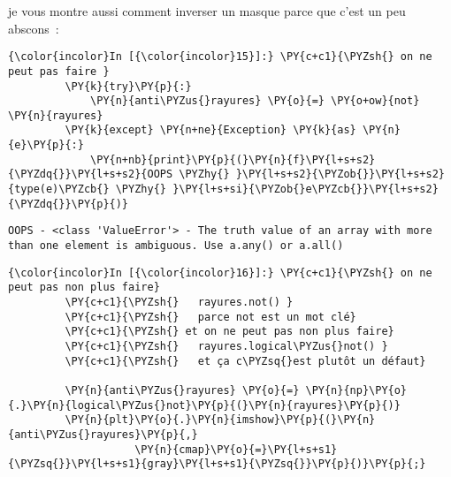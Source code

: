     je vous montre aussi comment inverser un masque parce que c'est un peu
abscons~:

    \begin{Verbatim}[commandchars=\\\{\},frame=single,framerule=0.3mm,rulecolor=\color{cellframecolor}]
{\color{incolor}In [{\color{incolor}15}]:} \PY{c+c1}{\PYZsh{} on ne peut pas faire }
         \PY{k}{try}\PY{p}{:}
             \PY{n}{anti\PYZus{}rayures} \PY{o}{=} \PY{o+ow}{not} \PY{n}{rayures}
         \PY{k}{except} \PY{n+ne}{Exception} \PY{k}{as} \PY{n}{e}\PY{p}{:}
             \PY{n+nb}{print}\PY{p}{(}\PY{n}{f}\PY{l+s+s2}{\PYZdq{}}\PY{l+s+s2}{OOPS \PYZhy{} }\PY{l+s+s2}{\PYZob{}}\PY{l+s+s2}{type(e)\PYZcb{} \PYZhy{} }\PY{l+s+si}{\PYZob{}e\PYZcb{}}\PY{l+s+s2}{\PYZdq{}}\PY{p}{)}
\end{Verbatim}


    \begin{Verbatim}[commandchars=\\\{\},frame=single,framerule=0.3mm,rulecolor=\color{cellframecolor}]
OOPS - <class 'ValueError'> - The truth value of an array with more than one element is ambiguous. Use a.any() or a.all()
\end{Verbatim}

    \begin{Verbatim}[commandchars=\\\{\},frame=single,framerule=0.3mm,rulecolor=\color{cellframecolor}]
{\color{incolor}In [{\color{incolor}16}]:} \PY{c+c1}{\PYZsh{} on ne peut pas non plus faire}
         \PY{c+c1}{\PYZsh{}   rayures.not() }
         \PY{c+c1}{\PYZsh{}   parce not est un mot clé}
         \PY{c+c1}{\PYZsh{} et on ne peut pas non plus faire}
         \PY{c+c1}{\PYZsh{}   rayures.logical\PYZus{}not() }
         \PY{c+c1}{\PYZsh{}   et ça c\PYZsq{}est plutôt un défaut}
         
         \PY{n}{anti\PYZus{}rayures} \PY{o}{=} \PY{n}{np}\PY{o}{.}\PY{n}{logical\PYZus{}not}\PY{p}{(}\PY{n}{rayures}\PY{p}{)}
         \PY{n}{plt}\PY{o}{.}\PY{n}{imshow}\PY{p}{(}\PY{n}{anti\PYZus{}rayures}\PY{p}{,} 
                    \PY{n}{cmap}\PY{o}{=}\PY{l+s+s1}{\PYZsq{}}\PY{l+s+s1}{gray}\PY{l+s+s1}{\PYZsq{}}\PY{p}{)}\PY{p}{;}
\end{Verbatim}


    \begin{center}
    \end{center}
    { \hspace*{\fill} \\}
    
